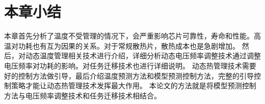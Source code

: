 \section{本章小结}\label{sec:xiaojie2}

本章首先分析了温度不受管理的情况下，会严重影响芯片可靠性，寿命和性能。高温对功耗也有互为因果的关系。对于常规散热片，散热成本也是急剧增加。
然后，对动态温度管理相关技术进行介绍，详细分析动态电压频率调整技术通过调整电压频率对功耗的影响。对任务迁移技术也进行详细说明。
动态热管理技术需要好的控制方法做引导，最后介绍温度预测方法和模型预测控制方法，完整的引导控制策略才能让动态热管理技术发挥最大作用。
本论文的方法就是将模型预测控制方法与电压频率调整技术和任务迁移技术相结合。























